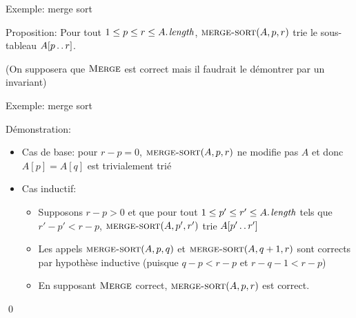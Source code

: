 \begin{frame}{Exemple: merge sort}
\begin{center}\small
{}
\end{center}

Proposition: Pour tout $1\leq p\leq r\leq \attrib{A}{length}$, $\textnormal{\scshape merge-sort}(A,p,r)$ trie le sous-tableau $A[p\mathinner{\ldotp\ldotp} r]$.

\bigskip

(On supposera que $\textnormal{\scshape Merge}$ est correct mais il faudrait le démontrer par un invariant)

\end{frame}

\begin{frame}{Exemple: merge sort}
\begin{center}\small
{}
\end{center}

Démonstration:
\begin{itemize}
\item Cas de base: pour $r-p=0$, $\textnormal{\scshape merge-sort}(A,p,r)$ ne modifie pas $A$ et donc $A[p]=A[q]$ est trivialement trié
\item Cas inductif:
\begin{itemize}
\item Supposons $r-p>0$ et que pour tout $1\leq p'\leq r'\leq \attrib{A}{length}$ tels que $r'-p'<r-p$, $\textnormal{\scshape merge-sort}(A,p',r')$ trie $A[p'\mathinner{\ldotp\ldotp} r']$
\item Les appels $\textnormal{\scshape merge-sort}(A,p,q)$ et $\textnormal{\scshape merge-sort}(A,q+1,r)$ sont corrects par hypothèse inductive (puisque $q-p<r-p$ et $r-q-1<r-p$)
\item En supposant $\textnormal{\scshape Merge}$ correct, $\textnormal{\scshape merge-sort}(A,p,r)$ est correct.
\end{itemize}
\end{itemize}\qed
{}
\end{frame}

